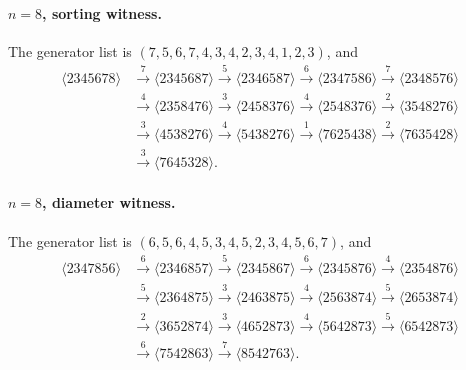 \documentclass[11pt]{article}
\newcommand{\cyc}[1]{\langle #1\rangle}
\begin{document}
\paragraph{$n=8$, sorting witness.}
The generator list is $(7,5,6,7,4,3,4,2,3,4,1,2,3)$, and
\[
\begin{aligned}
\cyc{2345678}&\xrightarrow{7}\cyc{2345687}\xrightarrow{5}\cyc{2346587}
\xrightarrow{6}\cyc{2347586}\xrightarrow{7}\cyc{2348576}\\
&\xrightarrow{4}\cyc{2358476}\xrightarrow{3}\cyc{2458376}
\xrightarrow{4}\cyc{2548376}\xrightarrow{2}\cyc{3548276}\\
&\xrightarrow{3}\cyc{4538276}\xrightarrow{4}\cyc{5438276}
\xrightarrow{1}\cyc{7625438}\xrightarrow{2}\cyc{7635428}\\
&\xrightarrow{3}\cyc{7645328}.
\end{aligned}
\]

\paragraph{$n=8$, diameter witness.}
The generator list is $(6,5,6,4,5,3,4,5,2,3,4,5,6,7)$, and
\[
\begin{aligned}
\cyc{2347856}&\xrightarrow{6}\cyc{2346857}\xrightarrow{5}\cyc{2345867}
\xrightarrow{6}\cyc{2345876}\xrightarrow{4}\cyc{2354876}\\
&\xrightarrow{5}\cyc{2364875}\xrightarrow{3}\cyc{2463875}
\xrightarrow{4}\cyc{2563874}\xrightarrow{5}\cyc{2653874}\\
&\xrightarrow{2}\cyc{3652874}\xrightarrow{3}\cyc{4652873}
\xrightarrow{4}\cyc{5642873}\xrightarrow{5}\cyc{6542873}\\
&\xrightarrow{6}\cyc{7542863}\xrightarrow{7}\cyc{8542763}.
\end{aligned}
\]



\end{document}
